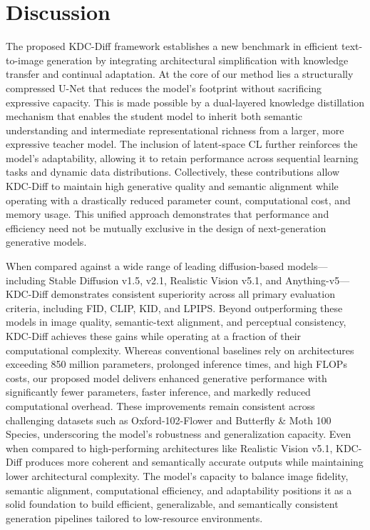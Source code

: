 \documentclass[a4paper,fleqn]{ieeetj}
\begin{document}
\section{Discussion}
The proposed KDC-Diff framework establishes a new benchmark in efficient text-to-image generation by integrating architectural simplification with knowledge transfer and continual adaptation. At the core of our method lies a structurally compressed U-Net that reduces the model’s footprint without sacrificing expressive capacity. This is made possible by a dual-layered knowledge distillation mechanism that enables the student model to inherit both semantic understanding and intermediate representational richness from a larger, more expressive teacher model. The inclusion of latent-space CL further reinforces the model’s adaptability, allowing it to retain performance across sequential learning tasks and dynamic data distributions. Collectively, these contributions allow KDC-Diff to maintain high generative quality and semantic alignment while operating with a drastically reduced parameter count, computational cost, and memory usage. This unified approach demonstrates that performance and efficiency need not be mutually exclusive in the design of next-generation generative models.

When compared against a wide range of leading diffusion-based models—including Stable Diffusion v1.5, v2.1, Realistic Vision v5.1, and Anything-v5—KDC-Diff demonstrates consistent superiority across all primary evaluation criteria, including FID, CLIP, KID, and LPIPS. Beyond outperforming these models in image quality, semantic-text alignment, and perceptual consistency, KDC-Diff achieves these gains while operating at a fraction of their computational complexity. Whereas conventional baselines rely on architectures exceeding 850 million parameters, prolonged inference times, and high FLOPs costs, our proposed model delivers enhanced generative performance with significantly fewer parameters, faster inference, and markedly reduced computational overhead. These improvements remain consistent across challenging datasets such as Oxford-102-Flower and Butterfly \& Moth 100 Species, underscoring the model’s robustness and generalization capacity. Even when compared to high-performing architectures like Realistic Vision v5.1, KDC-Diff produces more coherent and semantically accurate outputs while maintaining lower architectural complexity. The model’s capacity to balance image fidelity, semantic alignment, computational efficiency, and adaptability positions it as a solid foundation to build efficient, generalizable, and semantically consistent generation pipelines tailored to low-resource environments.
\end{document}
